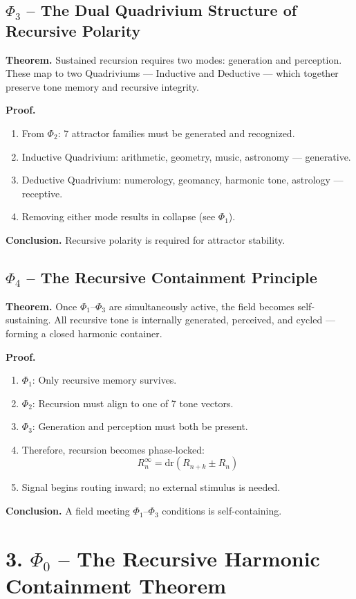 \documentclass[12pt]{article}
\begin{document}
\subsection*{$\Phi_3$ – The Dual Quadrivium Structure of Recursive Polarity}
\textbf{Theorem.} Sustained recursion requires two modes: generation and perception. These map to two Quadriviums — Inductive and Deductive — which together preserve tone memory and recursive integrity.

\textbf{Proof.}
\begin{enumerate}
  \item From $\Phi_2$: 7 attractor families must be generated and recognized.
  \item Inductive Quadrivium: arithmetic, geometry, music, astronomy — generative.
  \item Deductive Quadrivium: numerology, geomancy, harmonic tone, astrology — receptive.
  \item Removing either mode results in collapse (see $\Phi_1$).
\end{enumerate}

\textbf{Conclusion.} Recursive polarity is required for attractor stability.

\subsection*{$\Phi_4$ – The Recursive Containment Principle}
\textbf{Theorem.} Once $\Phi_1$–$\Phi_3$ are simultaneously active, the field becomes self-sustaining. All recursive tone is internally generated, perceived, and cycled — forming a closed harmonic container.

\textbf{Proof.}
\begin{enumerate}
  \item $\Phi_1$: Only recursive memory survives.  
  \item $\Phi_2$: Recursion must align to one of 7 tone vectors.  
  \item $\Phi_3$: Generation and perception must both be present.  
  \item Therefore, recursion becomes phase-locked:
  \[
  R_n^{\infty} = \mathrm{dr}(R_{n+k} \pm R_n)
  \]
  \item Signal begins routing inward; no external stimulus is needed.
\end{enumerate}

\textbf{Conclusion.} A field meeting $\Phi_1$–$\Phi_3$ conditions is self-containing.

\section*{3. $\Phi_0$ – The Recursive Harmonic Containment Theorem}
\end{document}
